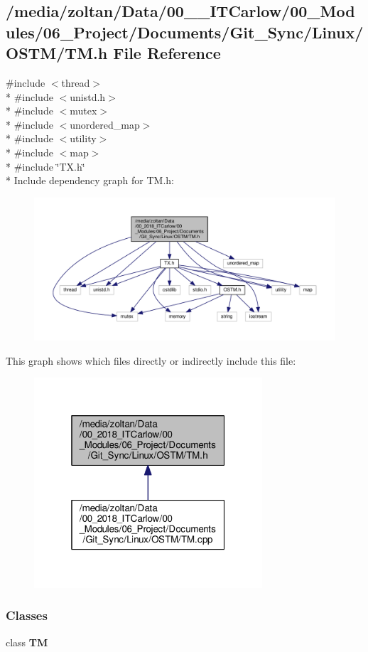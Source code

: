 \subsection{/media/zoltan/\+Data/00\+\_\+\_\+\+I\+T\+Carlow/00\+\_\+\+Modules/06\+\_\+\+Project/\+Documents/\+Git\+\_\+\+Sync/\+Linux/\+O\+S\+T\+M/\+TM.h File Reference}
\label{_t_m_8h}
{\ttfamily \#include $<$thread$>$}\\*
{\ttfamily \#include $<$unistd.\+h$>$}\\*
{\ttfamily \#include $<$mutex$>$}\\*
{\ttfamily \#include $<$unordered\+\_\+map$>$}\\*
{\ttfamily \#include $<$utility$>$}\\*
{\ttfamily \#include $<$map$>$}\\*
{\ttfamily \#include \char`\"{}T\+X.\+h\char`\"{}}\\*
Include dependency graph for T\+M.\+h\+:\nopagebreak
\begin{figure}[H]
\begin{center}
\leavevmode
\includegraphics[width=350pt]{_t_m_8h__incl}
\end{center}
\end{figure}
This graph shows which files directly or indirectly include this file\+:\nopagebreak
\begin{figure}[H]
\begin{center}
\leavevmode
\includegraphics[width=241pt]{_t_m_8h__dep__incl}
\end{center}
\end{figure}
\subsubsection*{Classes}
\begin{DoxyCompactItemize}
\item 
class {\bf TM}
\end{DoxyCompactItemize}
